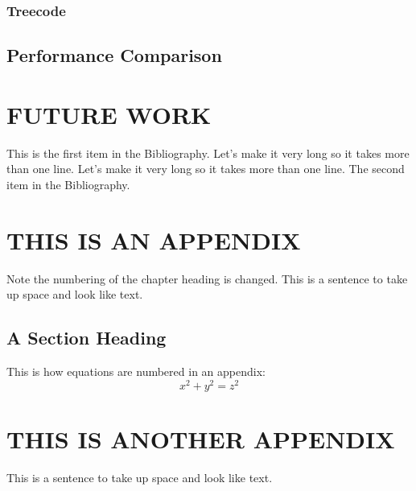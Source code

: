 \documentclass{thesis}
\begin{document}
\subsection{Treecode}
\section{Performance Comparison}

\chapter{FUTURE WORK}

\begin{singlespace}
\begin{thebibliography}{99}
 This is the first item in the Bibliography.
Let's make it very long so it takes more than one line.
Let's make it very long so it takes more than one line.
 The second item in the Bibliography.
\end{thebibliography}
\end{singlespace}

\appendix    %
\chapter{THIS IS AN APPENDIX}
Note the numbering of the chapter heading is changed.
This is a sentence to take up space and look like text.
\section{A Section Heading}
This is how equations are numbered in an appendix:
\begin{equation}
x^2 + y^2 = z^2
\end{equation} 

\chapter{THIS IS ANOTHER APPENDIX}
This is a sentence to take up space and look like text.
\end{document}
